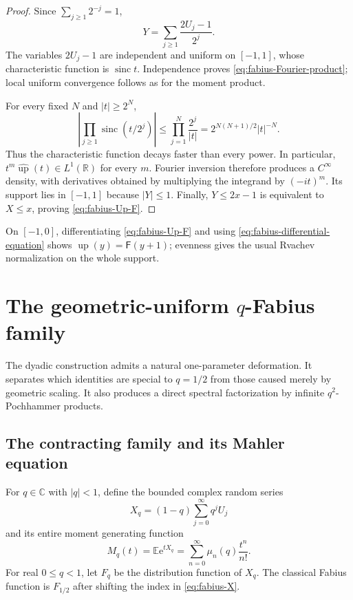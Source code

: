 \documentclass[11pt,oneside,openany]{book}
\theoremstyle{definition}
\theoremstyle{remark}
\newcommand{\C}{\mathbb C}
\newcommand{\R}{\mathbb R}
\newcommand{\e}{\mathrm e}
\newcommand{\Expect}{\mathbb E}
\newcommand{\Fab}{\mathsf F}
\newcommand{\Up}{\operatorname{up}}
\newcommand{\sinc}{\operatorname{sinc}}
\begin{document}
\begin{proof}
Since $\sum_{j\ge1}2^{-j}=1$,
\[
 Y=\sum_{j\ge1}\frac{2U_j-1}{2^j}.
\]
The variables $2U_j-1$ are independent and uniform on $[-1,1]$, whose
characteristic function is $\sinc t$.  Independence proves
\eqref{eq:fabius-Fourier-product}; local uniform convergence follows as for
the moment product.

For every fixed $N$ and $|t|\ge2^N$,
\[
 \left|\prod_{j\ge1}\sinc(t/2^j)\right|
 \le\prod_{j=1}^N\frac{2^j}{|t|}
 =2^{N(N+1)/2}|t|^{-N}.
\]
Thus the characteristic function decays faster than every power.  In
particular, $t^m\widehat{\Up}(t)\in L^1(\R)$ for every $m$.  Fourier inversion
therefore produces a $C^\infty$ density, with derivatives obtained by
multiplying the integrand by $(-it)^m$.  Its support lies in $[-1,1]$ because
$|Y|\le1$.  Finally, $Y\le2x-1$ is equivalent to $X\le x$, proving
\eqref{eq:fabius-Up-F}.
\end{proof}

On $[-1,0]$, differentiating \eqref{eq:fabius-Up-F} and using
\eqref{eq:fabius-differential-equation} shows
$\Up(y)=\Fab(y+1)$; evenness gives the usual Rvachev normalization on the
whole support.

\chapter{The geometric-uniform \texorpdfstring{$q$}{q}-Fabius family}\label{chap:q-fabius-family}

The dyadic construction admits a natural one-parameter deformation.  It
separates which identities are special to $q=1/2$ from those caused merely by
geometric scaling.  It also produces a direct spectral factorization by
infinite $q^2$-Pochhammer products.

\section{The contracting family and its Mahler equation}

For $q\in\C$ with $|q|<1$, define the bounded complex random series
\begin{equation}\label{eq:qF-Xq}
 X_q=(1-q)\sum_{j=0}^{\infty}q^jU_j
\end{equation}
and its entire moment generating function
\begin{equation}\label{eq:qF-Mq}
 M_q(t)=\Expect\e^{tX_q}
       =\sum_{n=0}^{\infty}\mu_n(q)\frac{t^n}{n!}.
\end{equation}
For real $0\le q<1$, let $F_q$ be the distribution function of $X_q$.
The classical Fabius function is $F_{1/2}$ after shifting the index in
\eqref{eq:fabius-X}.
\end{document}
